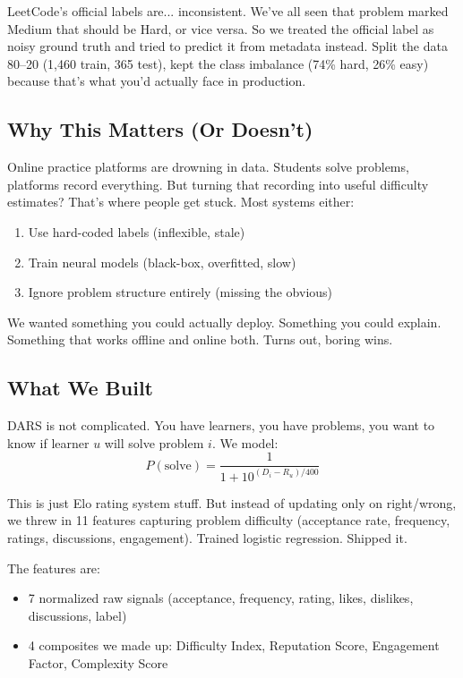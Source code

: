 \documentclass[conference]{IEEEtran}
\begin{document}
LeetCode's official labels are... inconsistent. We've all seen that problem marked Medium that should be Hard, or vice versa. So we treated the official label as noisy ground truth and tried to predict it from metadata instead. Split the data 80--20 (1,460 train, 365 test), kept the class imbalance (74\% hard, 26\% easy) because that's what you'd actually face in production.

\subsection{Why This Matters (Or Doesn't)}

Online practice platforms are drowning in data. Students solve problems, platforms record everything. But turning that recording into useful difficulty estimates? That's where people get stuck. Most systems either:
\begin{enumerate}
    \item Use hard-coded labels (inflexible, stale)
    \item Train neural models (black-box, overfitted, slow)
    \item Ignore problem structure entirely (missing the obvious)
\end{enumerate}

We wanted something you could actually deploy. Something you could explain. Something that works offline and online both. Turns out, boring wins.

\subsection{What We Built}

DARS is not complicated. You have learners, you have problems, you want to know if learner $u$ will solve problem $i$. We model:
$$P(\text{solve}) = \frac{1}{1 + 10^{(D_i - R_u) / 400}}$$

This is just Elo rating system stuff. But instead of updating only on right/wrong, we threw in 11 features capturing problem difficulty (acceptance rate, frequency, ratings, discussions, engagement). Trained logistic regression. Shipped it.

The features are:
\begin{itemize}
    \item 7 normalized raw signals (acceptance, frequency, rating, likes, dislikes, discussions, label)
    \item 4 composites we made up: Difficulty Index, Reputation Score, Engagement Factor, Complexity Score
\end{itemize}
\end{document}
